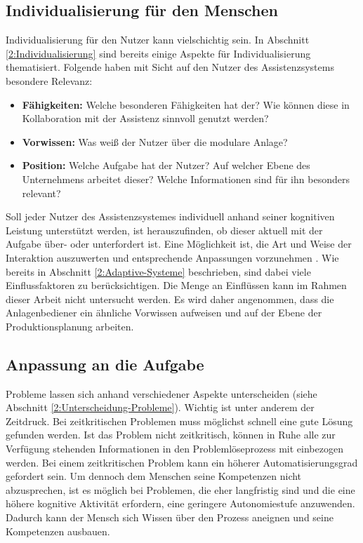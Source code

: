 \subsection{Individualisierung für den Menschen}
Individualisierung für den Nutzer kann vielschichtig sein. In Abschnitt \ref{2:Individualisierung} sind bereits einige Aspekte für Individualisierung thematisiert. Folgende haben mit Sicht auf den Nutzer des Assistenzsystems besondere Relevanz:
\begin{itemize}
\item \textbf{Fähigkeiten:} Welche besonderen Fähigkeiten hat der? Wie können diese in Kollaboration mit der Assistenz sinnvoll genutzt werden?
\item \textbf{Vorwissen:} Was weiß der Nutzer über die modulare Anlage?
\item \textbf{Position:} Welche Aufgabe hat der Nutzer? Auf welcher Ebene des Unternehmens arbeitet dieser? Welche Informationen sind für ihn besonders relevant?
\end{itemize}
Soll jeder Nutzer des Assistenzsystemes individuell anhand seiner kognitiven Leistung unterstützt werden, ist herauszufinden, ob dieser aktuell mit der Aufgabe über- oder unterfordert ist. Eine Möglichkeit ist, die Art und Weise der Interaktion auszuwerten und entsprechende Anpassungen vorzunehmen . Wie bereits in Abschnitt \ref{2:Adaptive-Systeme} beschrieben, sind dabei viele Einflussfaktoren zu berücksichtigen. Die Menge an Einflüssen kann im Rahmen dieser Arbeit nicht untersucht werden. Es wird daher angenommen, dass die Anlagenbediener ein ähnliche Vorwissen aufweisen und auf der Ebene der Produktionsplanung arbeiten.

\subsection{Anpassung an die Aufgabe}
\label{3:Anpassung-Aufgabe}
Probleme lassen sich anhand verschiedener Aspekte unterscheiden (siehe Abschnitt \ref{2:Unterscheidung-Probleme}). Wichtig ist unter anderem der Zeitdruck. Bei zeitkritischen Problemen muss möglichst schnell eine gute Lösung gefunden werden. Ist das Problem nicht zeitkritisch, können in Ruhe alle zur Verfügung stehenden Informationen in den Problemlöseprozess mit einbezogen werden. Bei einem zeitkritischen Problem kann ein höherer Automatisierungsgrad gefordert sein. Um dennoch dem Menschen seine Kompetenzen nicht abzusprechen, ist es möglich bei Problemen, die eher langfristig sind und die eine höhere kognitive Aktivität erfordern, eine geringere Autonomiestufe anzuwenden. Dadurch kann der Mensch sich Wissen über den Prozess aneignen und seine Kompetenzen ausbauen.

